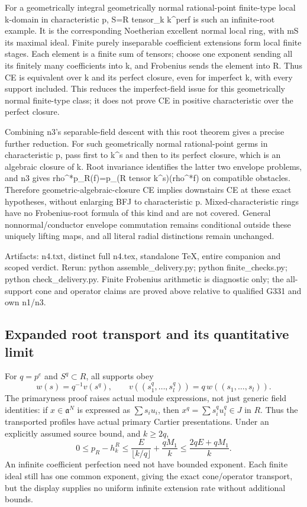 For a geometrically integral geometrically normal rational-point finite-type local k-domain in characteristic p, S=R tensor\_k k\textasciicircum{}perf is such an infinite-root example. It is the corresponding Noetherian excellent normal local ring, with mS its maximal ideal. Finite purely inseparable coefficient extensions form local finite stages. Each element is a finite sum of tensors; choose one exponent sending all its finitely many coefficients into k, and Frobenius sends the element into R. Thus CE is equivalent over k and its perfect closure, even for imperfect k, with every support included. This reduces the imperfect-field issue for this geometrically normal finite-type class; it does not prove CE in positive characteristic over the perfect closure.

Combining n3's separable-field descent with this root theorem gives a precise further reduction. For such geometrically normal rational-point germs in characteristic p, pass first to k\textasciicircum{}s and then to its perfect closure, which is an algebraic closure of k. Root invariance identifies the latter two envelope problems, and n3 gives rho\textasciicircum{}*p\_R(f)=p\_(R tensor k\textasciicircum{}s)(rho\textasciicircum{}*f) on compatible obstacles. Therefore geometric-algebraic-closure CE implies downstairs CE at these exact hypotheses, without enlarging BFJ to characteristic p. Mixed-characteristic rings have no Frobenius-root formula of this kind and are not covered. General nonnormal/conductor envelope commutation remains conditional outside these uniquely lifting maps, and all literal radial distinctions remain unchanged.

Artifacts: n4.txt, distinct full n4.tex, standalone TeX, entire companion and scoped verdict. Rerun: python assemble\_delivery.py; python finite\_checks.py; python check\_delivery.py. Finite Frobenius arithmetic is diagnostic only; the all-support cone and operator claims are proved above relative to qualified G331 and own n1/n3.

\subsection*{Expanded root transport and its quantitative limit}
For $q=p^e$ and $S^q\subset R$, all supports obey
\[
 w(s)=q^{-1}v(s^q),\qquad
 v((s_1^q,\ldots,s_l^q))=q\,w((s_1,\ldots,s_l)).
\]
The primaryness proof raises actual module expressions, not just
generic field identities: if $x\in\mathfrak a^N$ is expressed as
$\sum s_i u_i$, then $x^q=\sum s_i^qu_i^q\in J$ in $R$.
Thus the transported profiles have actual primary Cartier presentations.
Under an explicitly assumed source bound, and $k\ge2q$,
\[
 0\le p_R-h_k^R\le
 \frac{E}{\lfloor k/q\rfloor}+\frac{qM_1}{k}
 \le\frac{2qE+qM_1}{k}.
\]
An infinite coefficient perfection need not have bounded exponent.
Each finite ideal still has one common exponent, giving the exact
cone/operator transport, but the display supplies no uniform infinite
extension rate without additional bounds.

